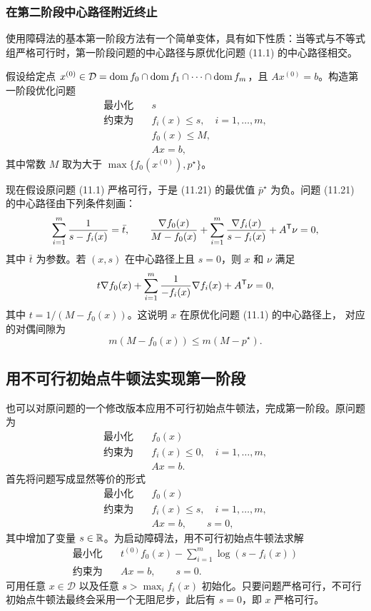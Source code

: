 \subsubsection*{在第二阶段中心路径附近终止}
使用障碍法的基本第一阶段方法有一个简单变体，具有如下性质：当等式与不等式组严格可行时，第一阶段问题的中心路径与原优化问题 (11.1) 的中心路径相交。

假设给定点 $x^{(0)}\in\mathcal D=\operatorname{dom} f_0\cap\operatorname{dom} f_1\cap\cdots\cap\operatorname{dom} f_m$，且 $Ax^{(0)}=b$。构造第一阶段优化问题
\begin{equation}\begin{aligned}
\text{最小化}\quad&s\\
\text{约束为}\quad&f_i(x)\le s,\quad i=1,\ldots,m,\\
&f_0(x)\le M,\\&Ax=b,
\end{aligned}\tag{11.21}\end{equation}
其中常数 $M$ 取为大于 $\max\{f_0(x^{(0)}),p^\star\}$。

现在假设原问题 (11.1) 严格可行，于是 (11.21) 的最优值 $\bar p^\star$ 为负。问题 (11.21) 的中心路径由下列条件刻画：
\[
\sum_{i=1}^m\frac1{s-f_i(x)}=\bar t,\qquad
\frac{\nabla f_0(x)}{M-f_0(x)}+\sum_{i=1}^m\frac{\nabla f_i(x)}{s-f_i(x)}+A^\mathsf T\nu=0,
\]
其中 $\bar t$ 为参数。若 $(x,s)$ 在中心路径上且 $s=0$，则 $x$ 和 $\nu$ 满足
\[
t\nabla f_0(x)+\sum_{i=1}^m\frac1{-f_i(x)}\nabla f_i(x)+A^\mathsf T\nu=0,
\]
其中 $t=1/(M-f_0(x))$。这说明 $x$ 在原优化问题 (11.1) 的中心路径上，
对应的对偶间隙为
\begin{equation}
m(M-f_0(x))\le m(M-p^\star).\tag{11.22}
\end{equation}

\subsection{用不可行初始点牛顿法实现第一阶段}
也可以对原问题的一个修改版本应用不可行初始点牛顿法，完成第一阶段。原问题为
\[
\begin{aligned}\text{最小化}\quad&f_0(x)\\\text{约束为}\quad&f_i(x)\le0,\quad i=1,\ldots,m,\\&Ax=b.\end{aligned}
\]
首先将问题写成显然等价的形式
\[
\begin{aligned}\text{最小化}\quad&f_0(x)\\\text{约束为}\quad&f_i(x)\le s,\quad i=1,\ldots,m,\\&Ax=b,\qquad s=0,\end{aligned}
\]
其中增加了变量 $s\in\mathbb R$。为启动障碍法，用不可行初始点牛顿法求解
\[
\begin{aligned}
\text{最小化}\quad&t^{(0)}f_0(x)-\sum_{i=1}^m\log(s-f_i(x))\\
\text{约束为}\quad&Ax=b,\qquad s=0.
\end{aligned}
\]
可用任意 $x\in\mathcal D$ 以及任意 $s>\max_i f_i(x)$ 初始化。只要问题严格可行，不可行初始点牛顿法最终会采用一个无阻尼步，此后有 $s=0$，即 $x$ 严格可行。

